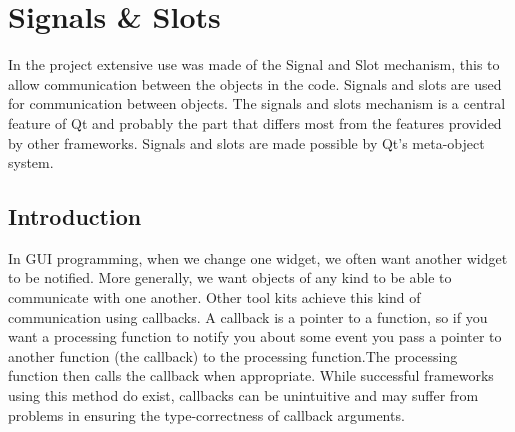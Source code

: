 %
\section{Signals \& Slots}
\label{ref:soft-signal-slot}
In the project extensive use was made of the Signal and Slot mechanism, this to
allow communication between the objects in the code. Signals and slots are used
for communication between objects. The signals and slots mechanism is a central
feature of Qt and probably the part that differs most from the features provided
by other frameworks. Signals and slots are made possible by Qt's meta-object
system.\cite{Qt:signal-slot}

\subsection{Introduction}
\label{ssec:soft-intro}
In GUI programming, when we change one widget, we often want another widget to
be notified. More generally, we want objects of any kind to be able to
communicate with one another.
%
Other tool kits achieve this kind of communication using callbacks. A callback is
a pointer to a function, so if you want a processing function to notify you
about some event you pass a pointer to another function (the callback) to the
processing function.\linebreak The processing function then calls the callback when
appropriate. While successful frameworks using this method do exist, callbacks
can be unintuitive and may suffer from problems in ensuring the type-correctness
of callback arguments.\cite{Qt:signal-slot}

